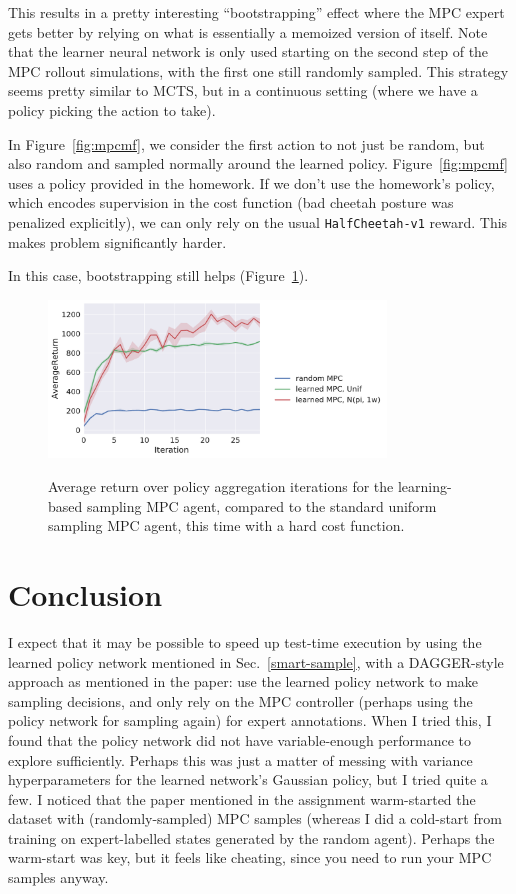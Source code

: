 \documentclass{article}
\begin{document}
This results in a pretty interesting ``bootstrapping'' effect where the MPC expert gets better by relying on what is essentially a memoized version of itself. Note that the learner neural network is only used starting on the second step of the MPC rollout simulations, with the first one still randomly sampled. This strategy seems pretty similar to MCTS, but in a continuous setting (where we have a policy picking the action to take).

In Figure~\ref{fig:mpcmf}, we consider the first action to not just be random, but also random and sampled normally around the learned policy. Figure~\ref{fig:mpcmf} uses a policy provided in the homework. If we don't use the homework's policy, which encodes supervision in the cost function (bad cheetah posture was penalized explicitly), we can only rely on the usual \texttt{HalfCheetah-v1} reward. This makes problem significantly harder.

In this case, bootstrapping still helps (Figure~\ref{fig:hardcost}).

\begin{figure}[!h]
  \begin{center}
    {\includegraphics[width=0.8\textwidth]{hard-AverageReturn.pdf}}
  \end{center}
  \caption{Average return over policy aggregation iterations for the learning-based sampling MPC agent, compared to the standard uniform sampling MPC agent, this time with a hard cost function.}
\label{fig:hardcost}
\end{figure}


\FloatBarrier

\section{Conclusion}

I expect that it may be possible to speed up test-time execution by using the learned policy network mentioned in Sec.~\ref{smart-sample}, with a DAGGER-style approach as mentioned in the paper: use the learned policy network to make sampling decisions, and only rely on the MPC controller (perhaps using the policy network for sampling again) for expert annotations. When I tried this, I found that the policy network did not have variable-enough performance to explore sufficiently. Perhaps this was just a matter of messing with variance hyperparameters for the learned network's Gaussian policy, but I tried quite a few. I noticed that the paper mentioned in the assignment warm-started the dataset with (randomly-sampled) MPC samples (whereas I did a cold-start from training on expert-labelled states generated by the random agent). Perhaps the warm-start was key, but it feels like cheating, since you need to run your MPC samples anyway.
\end{document}
